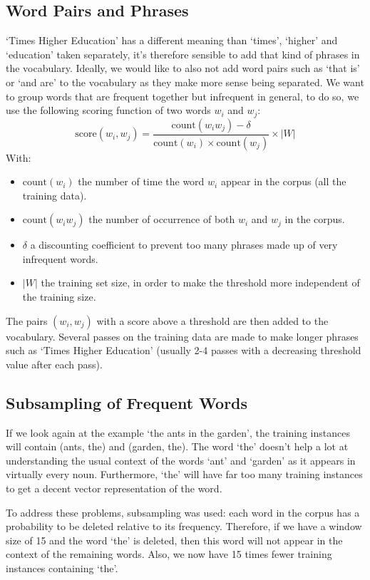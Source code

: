 \subsection{Word Pairs and Phrases}
`Times Higher Education' has a different meaning than `times', `higher' and `education' taken separately, it's therefore sensible to add that kind of phrases in the vocabulary. Ideally, we would like to also not add word pairs such as `that is' or `and are' to the vocabulary as they make more sense being separated. We want to group words that are frequent together but infrequent in general, to do so, we use the following scoring function of two words $w_i$ and $w_j$:
\begin{equation}
    \text{score}(w_i, w_j) = \frac{\text{count}(w_iw_j) - \delta}{\text{count}(w_i)\times \text{count}(w_j)}\times |W|
\end{equation}
With: 
\begin{itemize}[topsep=0pt]
    \item $\text{count}(w_i)$ the number of time the word $w_i$ appear in the corpus (all the training data).
    \item $\text{count}(w_iw_j)$ the number of occurrence of both $w_i$ and $w_j$ in the corpus. 
    \item $\delta$ a discounting coefficient to prevent too many phrases made up of very infrequent words.
    \item $|W|$ the training set size, in order to make the threshold more independent of the training size.
\end{itemize}

The pairs $(w_i, w_j)$ with a score above a threshold are then added to the vocabulary. Several passes on the training data are made to make longer phrases such as `Times Higher Education' (usually 2-4 passes with a decreasing threshold value after each pass).

\subsection{Subsampling of Frequent Words}
If we look again at the example `the ants in the garden', the training instances will contain (ants, the) and (garden, the). The word `the' doesn't help a lot at understanding the usual context of the words `ant' and `garden' as it appears in virtually every noun. Furthermore, `the' will have far too many training instances to get a decent vector representation of the word.

To address these problems, subsampling was used: each word in the corpus has a probability to be deleted relative to its frequency. Therefore, if we have a window size of 15 and the word `the' is deleted, then this word will not appear in the context of the remaining words. Also, we now have 15 times fewer training instances containing `the'.

